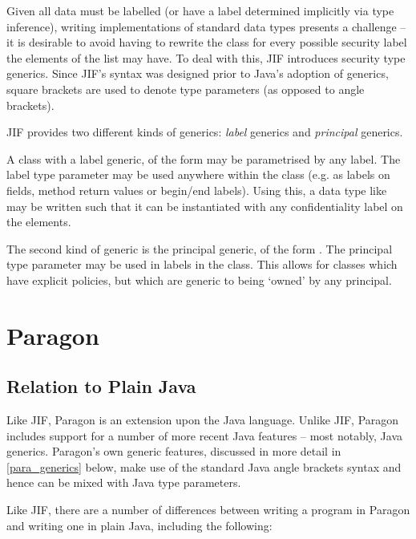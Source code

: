 Given all data must be labelled (or have a label determined implicitly via type inference), writing implementations of standard data types presents a challenge -- it is desirable to avoid having to rewrite the  class for every possible security label the elements of the list may have. To deal with this, JIF introduces security type generics. Since JIF's syntax was designed prior to Java's adoption of generics, square brackets are used to denote type parameters (as opposed to angle brackets).

JIF provides two different kinds of generics: \textit{label} generics and \textit{principal} generics.

A class with a label generic, of the form  may be parametrised by any label. The label type parameter may be used anywhere within the class (e.g. as labels on fields, method return values or begin/end labels). Using this, a data type like  may be written such that it can be instantiated with any confidentiality label on the elements.

The second kind of generic is the principal generic, of the form . The principal type parameter may be used in labels in the class. This allows for classes which have explicit policies, but which are generic to being `owned' by any principal.


\section{Paragon}

\subsection{Relation to Plain Java}

Like JIF, Paragon is an extension upon the Java language. Unlike JIF, Paragon includes support for a number of more recent Java features -- most notably, Java generics. Paragon's own generic features, discussed in more detail in \ref{para_generics} below, make use of the standard Java angle brackets syntax and hence can be mixed with Java type parameters.

Like JIF, there are a number of differences between writing a program in Paragon and writing one in plain Java, including the following:


